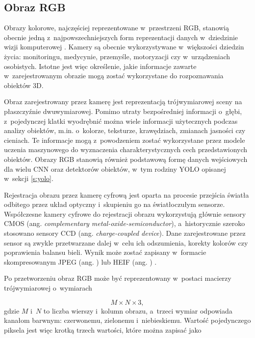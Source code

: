 \subsection{Obraz RGB}

Obrazy kolorowe, najczęściej reprezentowane w~przestrzeni RGB, stanowią obecnie jedną z~najpowszechniejszych form reprezentacji danych w~dziedzinie wizji komputerowej \cite{bib:wang2023imagesampling}. Kamery są obecnie wykorzystywane w~większości dziedzin życia: monitoringu, medycynie, przemyśle, motoryzacji czy w~urządzeniach osobistych. Istotne jest więc określenie, jakie informacje zawarte w~zarejestrowanym obrazie mogą zostać wykorzystane do rozpoznawania obiektów 3D.

Obraz zarejestrowany przez kamerę jest reprezentacją trójwymiarowej sceny na płaszczyźnie dwuwymiarowej. Pomimo utraty bezpośredniej informacji o~głębi, z~pojedynczej klatki wyodrębnić można wiele informacji użytecznych podczas analizy obiektów, m.in. o~kolorze, teksturze, krawędziach, zmianach jasności czy cieniach. Te informacje mogą z~powodzeniem zostać wykorzystane przez modele uczenia maszynowego do wyznaczenia charakterystycznych cech przedstawionych obiektów. Obrazy RGB stanowią również podstawową formę danych wejściowych dla wielu CNN oraz detektorów obiektów, w~tym rodziny YOLO opisanej w~sekcji \ref{s:yolo}.

Rejestracja obrazu przez kamerę cyfrową jest oparta na procesie przejścia światła odbitego przez układ optyczny i~skupieniu go na światłoczułym sensorze. Współczesne kamery cyfrowe do rejestracji obrazu wykorzystują głównie sensory CMOS (ang. \textit{complementary metal-oxide-semiconductor}), a~historycznie szeroko stosowano sensory CCD (ang. \textit{charge-coupled device}). Dane zarejestrowane przez sensor są zwykle przetwarzane dalej w~celu ich odszumienia, korekty kolorów czy poprawienia balansu bieli. Wynik może zostać zapisany w~formacie skompresowanym JPEG (ang. ) lub HEIF (ang. ) \cite{bib:szeliski2021cvalgorithms}.

Po przetworzeniu obraz RGB może być reprezentowany w~postaci macierzy trójwymiarowej o~wymiarach

\begin{equation}
    M \times N \times 3,
\end{equation}
gdzie $M$ i~$N$ to liczba wierszy i~kolumn obrazu, a~trzeci wymiar odpowiada kanałom barwnym: czerwonemu, zielonemu i~niebieskiemu. Wartość pojedynczego piksela jest więc krotką trzech wartości, które można zapisać jako

